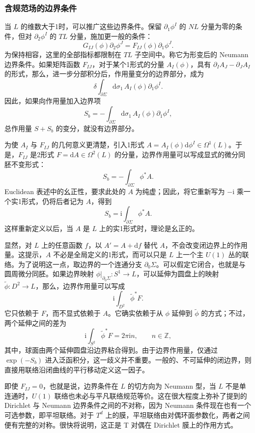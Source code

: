 \subsubsection{含规范场的边界条件}\label{sec:3.5.2.2}

当 $L$ 的维数大于1时，可以推广这些边界条件。保留 $\partial_1\phi^I$ 的 $NL$ 分量为零的条件，但对 $\partial_2\phi^I$ 的 $TL$ 分量，施加更一般的条件：
\[
G_{IJ}(\phi)\partial_2\phi^J
=F_{IJ}(\phi)\partial_1\phi^J.
\]
为保持相容，这里的全部指标都限制在 $TL$ 子空间中。称它为形变后的 Neumann 边界条件。如果矩阵函数 $F_{IJ}$，对于某个1形式的分量 $A_I(\phi)$，具有 $\partial_IA_J-\partial_JA_I$ 的形式，那么，进一步分部积分后，作用量变分的边界部分，成为
\[
\delta\int_{\partial\Sigma}\mathrm{d}\sigma_1\,
A_I(\phi)\partial_1\phi^I.
\]
因此，如果向作用量加入边界项
\begin{equation}\label{eq:3.140}
S_b=-\int_{\partial\Sigma}\mathrm{d}\sigma_1\,
A_I(\phi)\partial_1\phi^I,
\end{equation}
总作用量 $S+S_b$ 的变分，就没有边界部分。

为使 $A_I$ 与 $F_{IJ}$ 的几何意义更清楚，引入1形式 $A=A_I(\phi)\mathrm{d}\phi^I\in\Omega^1(L)$。于是，$F_{IJ}$ 是2形式 $F=\mathrm{d}A\in\Omega^2(L)$ 的分量，边界作用量可以写成显式的微分同胚不变形式：
\[
S_b=-\int_{\partial\Sigma}\phi^*A.
\]
Euclidean 表述中的幺正性，要求此处的 $A$ 为纯虚；因此，将它重新写为 $-\mathrm{i}$ 乘一个实1形式，仍将后者记为 $A$，得到
\[
S_b=\mathrm{i}\int_{\partial\Sigma}\phi^*A.
\]
这样重新定义以后，当 $A$ 是 $L$ 上的实1形式时，理论是幺正的。

显然，对 $L$ 上的任意函数 $f$，以 $A'=A+\mathrm{d}f$ 替代 $A$，不会改变闭边界上的作用量。这提示，$A$ 不必是全局定义的1形式，而可以只是 $L$ 上一个主 $U(1)$ 丛的联络。为了说明这一点，取边界的一个连通分支 $\partial_0\Sigma$。可以假定它闭合，也就是与圆周微分同胚。如果边界映射 $\phi|_{\partial_0\Sigma}\colon S^1\to L$，可以延伸为圆盘上的映射 $\widetilde\phi\colon D^2\to L$，那么，边界作用量可以写成
\[
\mathrm{i}\int_{D^2}\widetilde\phi^*F.
\]
它只依赖于 $F$，而不显式依赖于 $A$。它确实依赖于从 $\phi$ 延伸到 $\widetilde\phi$ 的方式；不过，两个延伸之间的差为
\[
\mathrm{i}\int_{S^2}\widetilde\phi^*F=2\pi\mathrm{i}n,
\qquad n\in\mathbb{Z},
\]
其中，球面由两个延伸圆盘沿边界粘合得到。由于边界作用量，仅通过 $\exp(-S_b)$ 进入泛函积分，这一歧义并不重要。一般的、不可延伸的闭边界，则直接用联络沿闭曲线的平行移动定义这一因子。

即使 $F_{IJ}=0$，也就是说，边界条件在 $L$ 的切方向为 Neumann 型，当 $L$ 不是单连通时，$U(1)$ 联络也未必与平凡联络规范等价。这在很大程度上弥补了提到的 Dirichlet 与 Neumann 边界条件之间的不对称，因为 Neumann 条件现在也有一个可选参数，即平坦联络。对于 $T^d$ 上的膜，平坦联络由对偶环面参数化，两者之间便有完整的对称。很快将说明，这正是 T 对偶在 Dirichlet 膜上的作用方式。


